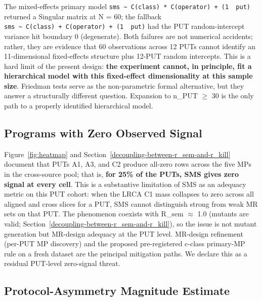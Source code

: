 \documentclass[manuscript,screen,review]{acmart}
\begin{document}
The mixed-effects primary model
\texttt{sms\ \textasciitilde{}\ C(class)\ *\ C(operator)\ +\ (1\ \textbar{}\ put)}
returned a Singular matrix at N = 60; the fallback
\texttt{sms\ \textasciitilde{}\ C(class)\ +\ C(operator)\ +\ (1\ \textbar{}\ put)}
had the PUT random-intercept variance hit boundary 0 (degenerate). Both
failures are not numerical accidents; rather, they are evidence that 60
observations across 12 PUTs cannot identify an 11-dimensional
fixed-effects structure plus 12-PUT random intercepts. This is a hard
limit of the present design: \textbf{the experiment cannot, in
principle, fit a hierarchical model with this fixed-effect
dimensionality at this sample size}. Friedman tests serve as the
non-parametric formal alternative, but they answer a structurally
different question. Expansion to n\_PUT $\geq$ 30 is the only path to a
properly identified hierarchical model.

\subsection{Programs with Zero Observed Signal}\label{put-level-zero-mass-cohort}

Figure~\ref{fig:heatmap} and Section~\ref{decoupling-between-r_sem-and-r_kill} document that PUTs A1, A3, and C2 produce all-zero
rows across the five MPs in the cross-source pool; that is,
\textbf{for 25\% of the PUTs, SMS gives zero signal at every
cell}. This is a substantive limitation of SMS as an adequacy metric on
this PUT cohort: when the LRCA C1 mass collapses to zero across all
aligned and cross slices for a PUT, SMS cannot distinguish strong from
weak MR sets on that PUT. The phenomenon coexists with R\_sem $\approx$ 1.0
(mutants are valid; Section~\ref{decoupling-between-r_sem-and-r_kill}), so the issue is not mutant generation but
MR-design adequacy at the PUT level. MR-design refinement (per-PUT
MP discovery) and the proposed pre-registered c-class primary-MP rule
on a fresh dataset are the principal mitigation paths. We declare this
as a residual PUT-level zero-signal threat.

\subsection{Protocol-Asymmetry Magnitude Estimate}\label{r13-protocol-asymmetry-magnitude-estimate}
\end{document}
